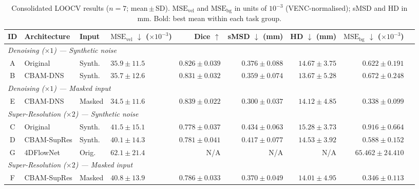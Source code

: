 \documentclass[11pt]{article}
\begin{document}
\begin{table}[!htbp]
  \centering
  \caption{Consolidated LOOCV results ($n=7$; mean\,$\pm$\,SD). $\text{MSE}_\text{vel}$ and
  $\text{MSE}_\text{bg}$ in units of $10^{-3}$ (VENC-normalised); sMSD and HD in mm.
  Bold: best mean within each task group.}
  \label{tab:summary}
  \setlength{\tabcolsep}{3pt}
  \small
  \begin{tabular}{clll rrrrr}
    \toprule
    ID & Architecture & Input &
      \makecell{$\text{MSE}_\text{vel}$ $\downarrow$\\(${\times}10^{-3}$)} &
      Dice $\uparrow$ &
      \makecell{sMSD $\downarrow$\\(mm)} &
      \makecell{HD $\downarrow$\\(mm)} &
      \makecell{$\text{MSE}_\text{bg}$ $\downarrow$\\(${\times}10^{-3}$)} \\
    \midrule
    \multicolumn{8}{l}{\textit{Denoising ($\times 1$) --- Synthetic noise}} \\
    \midrule
    A & Original  & Synth. & $35.9 \pm 11.5$ & $0.826 \pm 0.039$ & $0.376 \pm 0.088$ & $14.67 \pm 3.75$ & $0.622 \pm 0.191$ \\
    B & CBAM-DNS  & Synth. & $35.7 \pm 12.6$ & $0.831 \pm 0.032$ & $0.359 \pm 0.074$ & $\mathbf{13.67 \pm 5.28}$ & $0.672 \pm 0.248$ \\
    \multicolumn{8}{l}{\textit{Denoising ($\times 1$) --- Masked input}} \\
    \midrule
    E & CBAM-DNS  & Masked & $\mathbf{34.5 \pm 11.6}$ & $\mathbf{0.839 \pm 0.022}$ & $\mathbf{0.300 \pm 0.037}$ & $14.12 \pm 4.85$ & $\mathbf{0.338 \pm 0.099}$ \\
    \midrule
    \multicolumn{8}{l}{\textit{Super-Resolution ($\times 2$) --- Synthetic noise}} \\
    \midrule
    C & Original    & Synth. & $41.5 \pm 15.1$ & $0.778 \pm 0.037$ & $0.434 \pm 0.063$ & $15.28 \pm 3.73$ & $0.916 \pm 0.664$ \\
    D & CBAM-SupRes & Synth. & $\mathbf{40.1 \pm 14.3}$ & $0.781 \pm 0.041$ & $0.417 \pm 0.077$ & $14.53 \pm 3.92$ & $0.588 \pm 0.152$ \\
    G & 4DFlowNet   & Orig.  & $62.1 \pm 21.4$ & N/A & N/A & N/A & $65.462 \pm 24.410$ \\
    \multicolumn{8}{l}{\textit{Super-Resolution ($\times 2$) --- Masked input}} \\
    \midrule
    F & CBAM-SupRes & Masked & $40.8 \pm 13.9$ & $\mathbf{0.786 \pm 0.033}$ & $\mathbf{0.370 \pm 0.049}$ & $\mathbf{14.01 \pm 4.95}$ & $\mathbf{0.346 \pm 0.113}$ \\
    \bottomrule
  \end{tabular}
\end{table}
\end{document}
